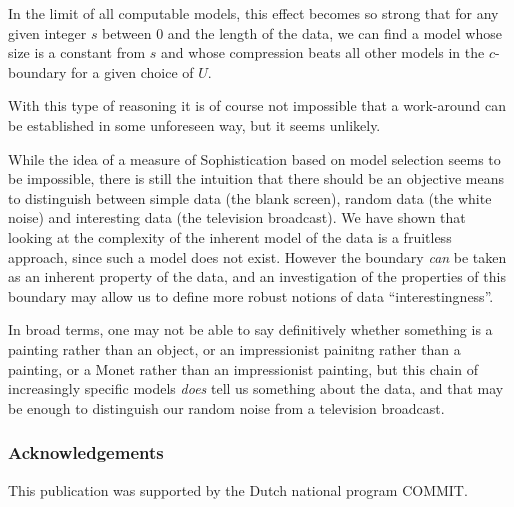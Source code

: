 \documentclass{style/llncs}
\begin{document}
In the limit of all computable models, this effect becomes so strong that for any given integer $s$ between 0 and the length of the data, we can find a model whose size is a constant from $s$ and whose compression beats all other models in the $c$-boundary for a given choice of $U$.

With this type of reasoning it is of course not impossible that a work-around can be established in some unforeseen way, but it seems unlikely.

While the idea of a measure of Sophistication based on model selection seems to be impossible, there is still the intuition that there should be an objective means to distinguish between simple data (the blank screen), random data (the white noise) and interesting data (the television broadcast). We have shown that looking at the complexity of the inherent model of the data is a fruitless approach, since such a model does not exist. However the boundary \emph{can} be taken as an inherent property of the data, and an investigation of the properties of this boundary may allow us to define more robust notions of data ``interestingness''.

In broad terms, one may not be able to say definitively whether something is a painting rather than an object, or an impressionist painitng rather than a painting, or a Monet rather than an impressionist painting, but this chain of increasingly specific models \emph{does} tell us something about the data, and that may be enough to distinguish our random noise from a television broadcast. 

\subsubsection{Acknowledgements} This publication was supported by the Dutch national program COMMIT.
 
\end{document}
